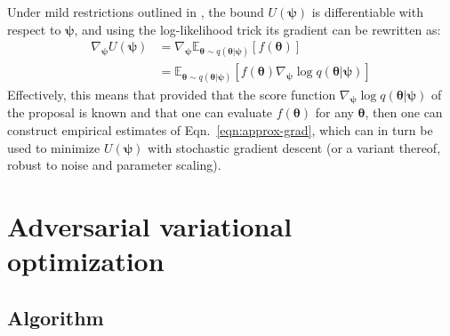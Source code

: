 \documentclass{article}
\newcommand{\bftheta}{{\bm \theta}}
\newcommand{\bfpsi}{{\bm \psi}}
\theoremstyle{plain}
\begin{document}
Under mild restrictions outlined in  \cite{2012arXiv1212.4507S}, the bound
$U(\bfpsi)$ is differentiable with respect to $\bfpsi$, and using the log-likelihood
trick its gradient can be rewritten as:
\begin{align}\label{eqn:approx-grad}
    \nabla_\bfpsi U(\bfpsi) &= \nabla_\bfpsi \mathbb{E}_{\bftheta \sim q(\bftheta|\bfpsi)} [f(\bftheta)] \nonumber \\
    &= \mathbb{E}_{\bftheta \sim q(\bftheta|\bfpsi)} [f(\bftheta) \nabla_\bfpsi \log q(\bftheta|\bfpsi)]
\end{align}
Effectively, this means that provided that the score function $\nabla_\bfpsi \log
q(\bftheta|\bfpsi)$ of the proposal is known and that one can evaluate
$f(\mathbf{\bftheta})$ for any $\bftheta$, then one can construct empirical
estimates of Eqn.~\ref{eqn:approx-grad}, which can in turn be used to minimize
$U(\bfpsi)$ with stochastic gradient descent (or a variant thereof, robust to noise
and parameter scaling).


\section{Adversarial variational optimization}

\subsection{Algorithm}
\end{document}

